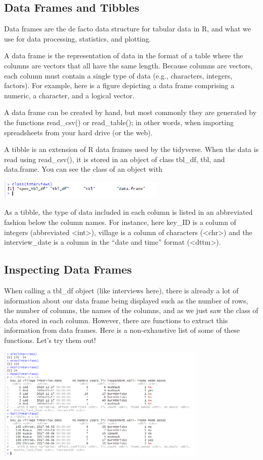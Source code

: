 \documentclass{article}
\begin{document}
\subsection{Data Frames and Tibbles}

Data frames are the de facto data structure for tabular data in R, and what we use for data processing, statistics, and plotting.

A data frame is the representation of data in the format of a table where the columns are vectors that all have the same length. Because columns are vectors, each column must contain a single type of data (e.g., characters, integers, factors). For example, here is a figure depicting a data frame comprising a numeric, a character, and a logical vector.

A data frame can be created by hand, but most commonly they are generated by the functions read\_csv() or read\_table(); in other words, when importing spreadsheets from your hard drive (or the web).

A tibble is an extension of R data frames used by the tidyverse. When the data is read using read\_csv(), it is stored in an object of class tbl\_df, tbl, and data.frame. You can see the class of an object with

\includegraphics[width=8cm]{Images/RStudio018.PNG}

As a tibble, the type of data included in each column is listed in an abbreviated fashion below the column names. For instance, here key\_ID is a column of integers (abbreviated <int>), village is a column of characters (<chr>) and the interview\_date is a column in the “date and time” format (<dttm>).

\subsection{Inspecting Data Frames}

When calling a tbl\_df object (like interviews here), there is already a lot of information about our data frame being displayed such as the number of rows, the number of columns, the names of the columns, and as we just saw the class of data stored in each column. However, there are functions to extract this information from data frames. Here is a non-exhaustive list of some of these functions. Let’s try them out!

\includegraphics[width=10cm]{Images/RStudio019.PNG}
\end{document}
